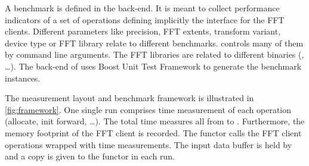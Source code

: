A \gearshifft{} benchmark is defined in the back-end. It is meant to collect performance indicators of a set of operations defining implicitly the interface for the FFT clients. Different parameters like precision, FFT extents, transform variant, device type or FFT library relate to different benchmarks.
\gearshifft{} controls many of them by command line arguments. The FFT libraries are related to different \gearshifft{} binaries (, \ldots).
The back-end of \gearshifft{} uses Boost Unit Test Framework to generate the benchmark instances.

The measurement layout and benchmark framework is illustrated in \cref{fig:framework}. One single run comprises time measurement of each operation (allocate, init forward, \ldots). The total time measures all from  to . Furthermore, the memory footprint of the FFT client is recorded. The functor  calls the FFT client operations wrapped with time measurements. The input data buffer is held by  and a copy is given to the  functor in each run.


